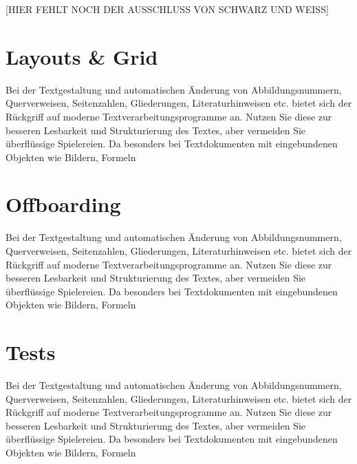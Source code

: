 [HIER FEHLT NOCH DER AUSSCHLUSS VON SCHWARZ UND WEISS]


\section{Layouts \& Grid}
Bei der Textgestaltung und automatischen Änderung von Abbildungsnummern, Querverweisen,
Seitenzahlen, Gliederungen, Literaturhinweisen etc. bietet sich der Rückgriff
auf moderne Textverarbeitungsprogramme an. Nutzen Sie diese zur besseren Lesbarkeit
und Strukturierung des Textes, aber vermeiden Sie überflüssige Spielereien. Da
besonders bei Textdokumenten mit eingebundenen Objekten wie Bildern, Formeln

\section{Offboarding}
Bei der Textgestaltung und automatischen Änderung von Abbildungsnummern, Querverweisen,
Seitenzahlen, Gliederungen, Literaturhinweisen etc. bietet sich der Rückgriff
auf moderne Textverarbeitungsprogramme an. Nutzen Sie diese zur besseren Lesbarkeit
und Strukturierung des Textes, aber vermeiden Sie überflüssige Spielereien. Da
besonders bei Textdokumenten mit eingebundenen Objekten wie Bildern, Formeln

\section{Tests}
Bei der Textgestaltung und automatischen Änderung von Abbildungsnummern, Querverweisen,
Seitenzahlen, Gliederungen, Literaturhinweisen etc. bietet sich der Rückgriff
auf moderne Textverarbeitungsprogramme an. Nutzen Sie diese zur besseren Lesbarkeit
und Strukturierung des Textes, aber vermeiden Sie überflüssige Spielereien. Da
besonders bei Textdokumenten mit eingebundenen Objekten wie Bildern, Formeln
